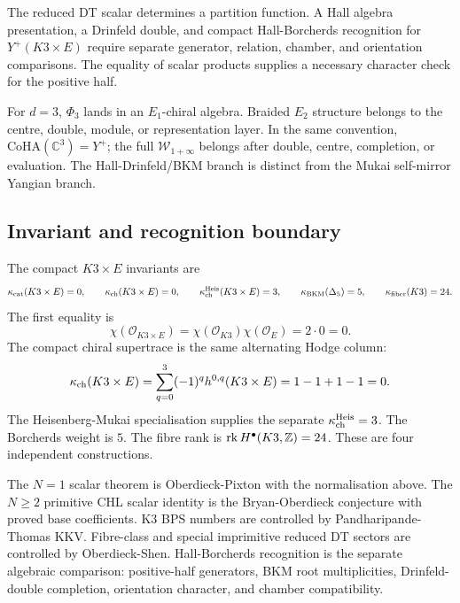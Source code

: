 The reduced DT scalar determines a partition function. A Hall algebra
presentation, a Drinfeld double, and compact Hall-Borcherds recognition
for \(Y^+(K3\times E)\) require separate generator, relation, chamber,
and orientation comparisons. The equality of scalar products supplies a
necessary character check for the positive half.

For \(d=3\), \(\Phi_3\) lands in an \(E_1\)-chiral algebra. Braided
\(E_2\) structure belongs to the centre, double, module, or
representation layer. In the same convention,
\(\mathrm{CoHA}(\mathbb C^3)=Y^+\); the
full \(\mathcal W_{1+\infty}\) belongs after double, centre,
completion, or evaluation. The Hall-Drinfeld/BKM branch is distinct
from the Mukai self-mirror Yangian branch.

\subsection*{Invariant and recognition boundary}

The compact \(K3\times E\) invariants are
\[
  \kappa_{\mathrm{cat}}(K3\times E)=0,\qquad
  \kappa_{\mathrm{ch}}(K3\times E)=0,\qquad
  \kappa_{\mathrm{ch}}^{\mathrm{Heis}}(K3\times E)=3,\qquad
  \kappa_{\mathrm{BKM}}(\Delta_5)=5,\qquad
  \kappa_{\mathrm{fiber}}(K3)=24.
\]
The first equality is
\[
  \chi(\mathcal O_{K3\times E})
  =
  \chi(\mathcal O_{K3})\chi(\mathcal O_E)
  =
  2\cdot 0
  =
  0.
\]
The compact chiral supertrace is the same alternating Hodge column:
\[
  \kappa_{\mathrm{ch}}(K3\times E)
  =
  \sum_{q=0}^3 (-1)^q h^{0,q}(K3\times E)
  =
  1-1+1-1
  =
  0.
\]
The Heisenberg-Mukai specialisation supplies the separate
\(\kappa_{\mathrm{ch}}^{\mathrm{Heis}}=3\). The Borcherds weight is \(5\). The fibre
rank is \(\operatorname{rk}H^\bullet(K3,\mathbb{Z})=24\). These are four
independent constructions.

The \(N=1\) scalar theorem is Oberdieck-Pixton with the normalisation
above. The \(N\ge2\) primitive CHL scalar identity is the
Bryan-Oberdieck conjecture with proved base coefficients. K3 BPS
numbers are controlled by Pandharipande-Thomas KKV. Fibre-class and
special imprimitive reduced DT sectors are controlled by
Oberdieck-Shen. Hall-Borcherds recognition is the separate algebraic
comparison: positive-half generators, BKM root multiplicities,
Drinfeld-double completion, orientation character, and chamber
compatibility.
